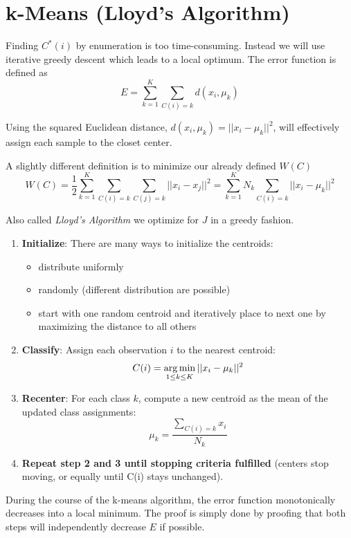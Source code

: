 \section{k-Means (Lloyd's Algorithm)}
Finding $C^*(i)$ by enumeration is too time-consuming. Instead we will use
iterative greedy descent which leads to a local optimum. The error function is
defined as
\begin{equation}
E = \sum_{k=1}^K \sum_{C(i)=k} d(x_i, \mu_k)
\end{equation}

Using the squared Euclidean distance, $d(x_i, \mu_k) = ||x_i - \mu_k||^2$, will
effectively assign each sample to the closet center.

A slightly different definition is to minimize our already defined $W(C)$
\begin{equation}
W(C) = \frac{1}{2} \sum\limits_{k=1}^K \sum\limits_{C(i)=k} \sum\limits_{C(j)=k} ||x_i - x_j||^2 = \sum\limits_{k=1}^K N_k \sum\limits_{C(i)=k} ||x_i - \mu_k||^2
\end{equation}

Also called \emph{Lloyd's Algorithm} we optimize for $J$ in a greedy fashion.
\begin{enumerate}
\item \textbf{Initialize}: There are many ways to initialize the centroids:
	\begin{itemize}
	\item distribute uniformly
	\item randomly (different distribution are possible)
    \item start with one random centroid and iteratively place to next one by
          maximizing the distance to all others
	\end{itemize}
\item \textbf{Classify}: Assign each observation $i$ to the nearest centroid: $$C(i) = \operatorname*{arg\,min}\limits_{1\leq k \leq K} ||x_i - \mu_k||^2$$
\item \textbf{Recenter}: For each class $k$, compute a new centroid as the mean of the updated class assignments: $$\mu_k = \frac{\sum\limits_{C(i)=k} x_i}{N_k}$$
\item \textbf{Repeat step 2 and 3 until stopping criteria fulfilled} (\eg centers stop moving, or equally until C(i) stays unchanged).
\end{enumerate}

During the course of the k-means algorithm, the error function monotonically
decreases into a local minimum. The proof is simply done by proofing that both
steps will independently decrease $E$ if possible.

